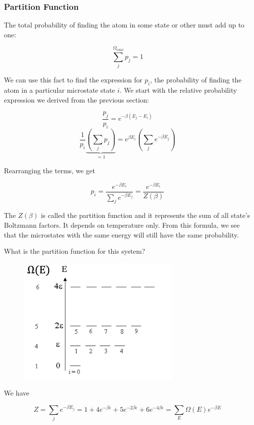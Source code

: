 \documentclass[12pt, a4paper]{article}
\newcounter{exa}
\begin{document}
\subsubsection{Partition Function}

The total probability of finding the atom in some state or other must add up to one:

$$\sum_j^{\Omega_{total}}p_j=1$$

We can use this fact to find the expression for $p_i$, the probability of finding the atom in a particular microstate state $i$. We start with the relative probability expression we derived from the previous section:

$$\frac{p_j}{p_i}=e^{-\beta(E_j-E_i)}$$
$$\frac{1}{p_i} \underbrace{\left( \sum_j p_j \right)}_{=1} = e^{\beta E_i}\left( \sum_j e^{-\beta E_j} \right)$$

Rearranging the terms, we get

$$\boxed{p_i=\frac{e^{-\beta E_i}}{\sum_j e^{-\beta E_j}}=\frac{e^{-\beta E_i}}{Z(\beta)}}$$

The $Z(\beta)$ is called the partition function and it represents the sum of all state's Boltzmann factors. It depends on temperature only. From this formula, we see that the microstates with the same energy will still have the same probability.

\begin{texample}
What is the partition function for this system?

\begin{figure}[H]
\centering
\includegraphics[width=80mm]{15.png}
\end{figure}

We have

$$Z=\sum_j e^{-\beta E_j}=1+4e^{-\beta\epsilon}+5e^{-2\beta\epsilon}+6e^{-4\beta\epsilon}=\sum_E \Omega(E)e^{-\beta E}$$
\end{texample}
\end{document}
